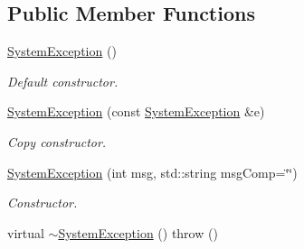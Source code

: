 \subsection*{Public Member Functions}
\begin{DoxyCompactItemize}
\item 
\hypertarget{classSystemException_a6ef82d48c4386f3629a76ecc60aa6dee}{
\hyperlink{classSystemException_a6ef82d48c4386f3629a76ecc60aa6dee}{SystemException} ()}
\label{classSystemException_a6ef82d48c4386f3629a76ecc60aa6dee}

\begin{DoxyCompactList}\small\item\em Default constructor. \item\end{DoxyCompactList}\item 
\hypertarget{classSystemException_a60c558dda09f6c047fbd0aa060966c94}{
\hyperlink{classSystemException_a60c558dda09f6c047fbd0aa060966c94}{SystemException} (const \hyperlink{classSystemException}{SystemException} \&e)}
\label{classSystemException_a60c558dda09f6c047fbd0aa060966c94}

\begin{DoxyCompactList}\small\item\em Copy constructor. \item\end{DoxyCompactList}\item 
\hypertarget{classSystemException_a4b00bceb1ecce06d762d619fad3f873e}{
\hyperlink{classSystemException_a4b00bceb1ecce06d762d619fad3f873e}{SystemException} (int msg, std::string msgComp=\char`\"{}\char`\"{})}
\label{classSystemException_a4b00bceb1ecce06d762d619fad3f873e}

\begin{DoxyCompactList}\small\item\em Constructor. \item\end{DoxyCompactList}\item 
\hypertarget{classSystemException_a28b81b338079cb1add39daf63949c2b6}{
virtual \hyperlink{classSystemException_a28b81b338079cb1add39daf63949c2b6}{$\sim$SystemException} ()  throw ()}
\label{classSystemException_a28b81b338079cb1add39daf63949c2b6}


\end{DoxyCompactItemize}
